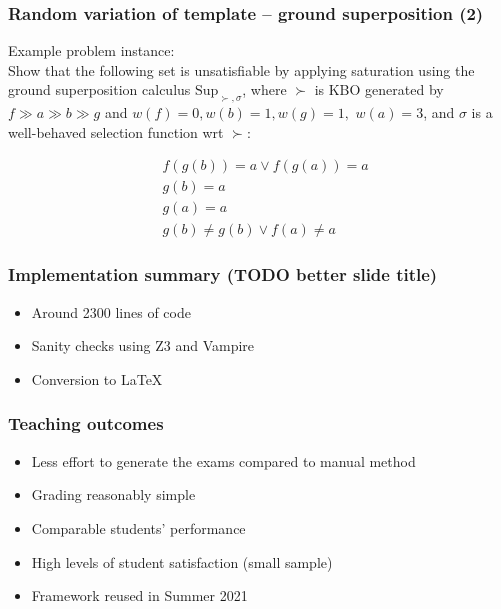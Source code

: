 \documentclass[xcolor={table}]{beamer}
\begin{document}


\begin{frame}
  \frametitle{Random variation of template -- ground superposition (2)}


Example problem instance:\\
  \vspace*{1em}
Show that the following set is unsatisfiable by applying saturation using the
ground superposition calculus $\textrm{Sup}_{\succ,\sigma}$, where
$\succ$ is KBO generated by 
$f \gg a \gg b \gg g$
and
$w(f) = 0, w(b) = 1, w(g) = 1,$ $w(a) = 3$,
and $\sigma$ is a well-behaved selection function wrt $\succ$:

\begin{align*}
& f(g(b)) = a \lor f(g(a)) = a
~\\~
& g(b) = a
~\\~
& g(a) = a
~\\~
& g(b)  \neq  g(b) \lor f(a)  \neq  a
\end{align*}


\end{frame}



\begin{frame}
\frametitle{Implementation summary (TODO better slide title)}
\begin{itemize}
\item Around 2300 lines of code
\item Sanity checks using Z3 and Vampire
\item Conversion to \LaTeX
\end{itemize}
\end{frame}



\begin{frame}
\frametitle{Teaching outcomes}
\begin{itemize}
\item Less effort to generate the exams compared to manual method
\item Grading reasonably simple
\item Comparable students' performance
\item High levels of student satisfaction (small sample)
\item Framework reused in Summer 2021
\end{itemize}
\end{frame}
\end{document}
